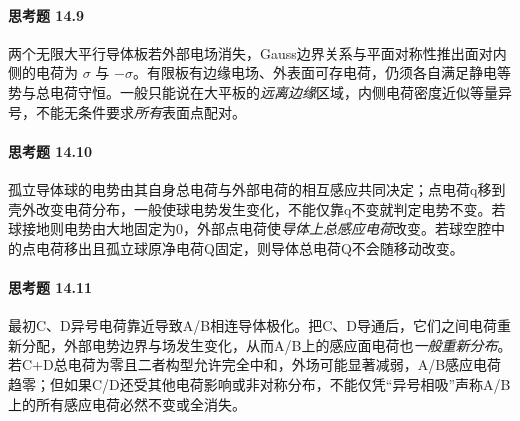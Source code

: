 \paragraph{思考题 14.9}
两个无限大平行导体板若外部电场消失，Gauss边界关系与平面对称性推出面对内侧的电荷为 \(\sigma\) 与 \(-\sigma\)。有限板有边缘电场、外表面可存电荷，仍须各自满足静电等势与总电荷守恒。一般只能说在大平板的\emph{远离边缘}区域，内侧电荷密度近似等量异号，不能无条件要求\emph{所有}表面点配对。

\paragraph{思考题 14.10}
孤立导体球的电势由其自身总电荷与外部电荷的相互感应共同决定；点电荷q移到壳外改变电荷分布，一般使球电势发生变化，不能仅靠q不变就判定电势不变。若球接地则电势由大地固定为0，外部点电荷使\emph{导体上总感应电荷}改变。若球空腔中的点电荷移出且孤立球原净电荷Q固定，则导体总电荷Q不会随移动改变。

\paragraph{思考题 14.11}
最初C、D异号电荷靠近导致A/B相连导体极化。把C、D导通后，它们之间电荷重新分配，外部电势边界与场发生变化，从而A/B上的感应面电荷也\emph{一般重新分布}。若C+D总电荷为零且二者构型允许完全中和，外场可能显著减弱，A/B感应电荷趋零；但如果C/D还受其他电荷影响或非对称分布，不能仅凭“异号相吸”声称A/B上的所有感应电荷必然不变或全消失。
